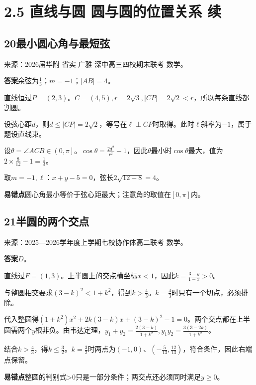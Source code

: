 \documentclass[UTF8,11pt,a4paper,fontset=windows]{ctexart}
\newcommand{\qhead}[2]{\subsection{#1\texorpdfstring{\quad}{ }#2}}
\newcommand{\qsource}[1]{{\footnotesize 来源：#1。\par}}
\begin{document}
\section{2.5 直线与圆 圆与圆的位置关系 续}

\qhead{20}{最小圆心角与最短弦}
\qsource{2026届华附 省实 广雅 深中高三四校期末联考 数学}
\textbf{答案}\quad 余弦为\(\frac{1}{3}\)；\(m= - 1\)；\(\lvert AB\rvert = 4\)。\par
直线恒过\(P= \left(2,\allowbreak 3\right)\)。\(C= \left(4,\allowbreak 5\right),\allowbreak r= 2\sqrt{3},\allowbreak \lvert CP\rvert = 2\sqrt{2}< r\)，所以每条直线都割圆。\par
设弦心距\(d\)，则\(d\le \lvert CP\rvert = 2\sqrt{2}\)，等号在\(\ell \perp CP\)时取得。此时\(\ell \)斜率为\(- 1\)，属于题设直线束。\par
设\(\theta = \angle ACB\in \left(0,\allowbreak \pi \right]\)。\(\cos \theta = \frac{2d^{2}}{r^{2}}- 1\)，因此\(\theta \)最小时\(\cos \theta \)最大，值为\(2\times \frac{8}{12}- 1= \frac{1}{3}\)。\par
取\(m= - 1,\allowbreak \ell \)：\(x+ y- 5= 0\)，弦长\(2\sqrt{12- 8}= 4\)。\par
{\small\textbf{易错点}\quad 圆心角最小等价于弦心距最大；注意角的取值在\(\left[0,\allowbreak \pi \right]\)内。\par}

\qhead{21}{半圆的两个交点}
\qsource{2025—2026学年度上学期七校协作体高二联考 数学}
\textbf{答案}\quad \(D\)。\par
直线过\(F= \left(1,\allowbreak 3\right)\)。上半圆上的交点横坐标\(x< 1\)，因此\(k= \frac{3- y}{1- x}> 0\)。\par
与整圆相交要求\(\left(3- k\right)^{2}< 1+ k^{2}\)，得到\(k> \frac{4}{3}\)。\(k= \frac{4}{3}\)时只有一个切点，必须排除。\par
代入整圆得\(\left(1+ k^{2}\right)x^{2}+ 2k\left(3- k\right)x+ \left(3- k\right)^{2}- 1= 0\)。两个交点都在上半圆需两个\(y\)根非负。由韦达定理，\(y_{1}+ y_{2}= \frac{2\left(3- k\right)}{1+ k^{2}},\allowbreak y_{1}y_{2}= \frac{3\left(3- 2k\right)}{1+ k^{2}}\)。\par
结合\(k> \frac{4}{3}\)，得\(k\le \frac{3}{2}\)。\(k= \frac{3}{2}\)时两点为\(\left(- 1,\allowbreak 0\right)\)、\(\left(- \frac{5}{13},\allowbreak \frac{12}{13}\right)\)，符合条件，因此右端点保留。\par
{\small\textbf{易错点}\quad 整圆的判别式>\(0\)只是一部分条件；两交点还必须同时满足\(y\ge 0\)。\par}

\clearpage
\end{document}
